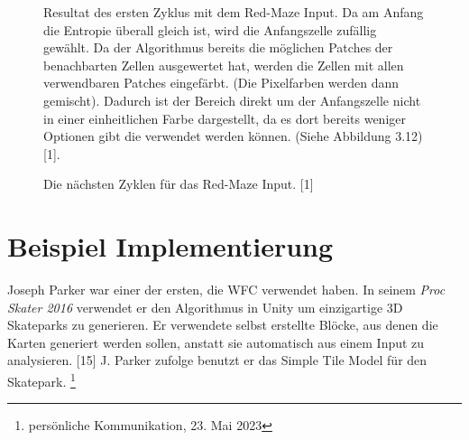 \documentclass[12pt]{report}
\begin{document}
\begin{figure}[H]
    \centering
    \caption{
        Resultat des ersten Zyklus mit dem Red-Maze Input. Da am Anfang die Entropie überall gleich ist, wird die Anfangszelle zufällig gewählt.
        Da der Algorithmus bereits die möglichen Patches der benachbarten Zellen ausgewertet hat, werden die Zellen mit allen verwendbaren Patches eingefärbt.
        {(Die Pixelfarben werden dann gemischt)}.
        Dadurch ist der Bereich direkt um der Anfangszelle nicht in einer einheitlichen Farbe dargestellt, da es dort bereits weniger Optionen gibt die verwendet werden können.
        {(Siehe Abbildung 3.12)} {[1]}.
    }%
\end{figure}

\begin{figure}[H]
    \centering
    \caption{Die nächsten Zyklen für das Red-Maze Input. {[1]}}%
\end{figure}

\section{Beispiel Implementierung}

Joseph Parker war einer der ersten, die WFC verwendet haben.
In seinem \textit{Proc Skater 2016} verwendet er den Algorithmus in Unity um einzigartige 3D Skateparks zu generieren.
Er verwendete selbst erstellte Blöcke, aus denen die Karten generiert werden sollen, anstatt sie automatisch aus einem Input zu analysieren. [15]
J. Parker zufolge benutzt er das Simple Tile Model für den Skatepark. \footnote[4]{persönliche Kommunikation, 23. Mai 2023}
\end{document}
